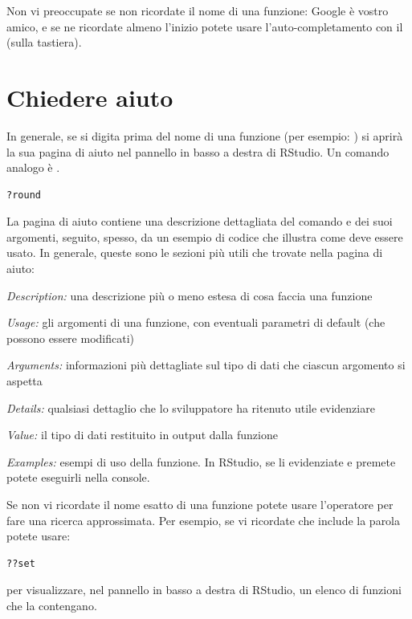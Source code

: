 \noindent Non vi preoccupate se non ricordate il nome di una funzione: Google \`e vostro amico, e se ne ricordate almeno l'inizio potete usare l'auto-completamento con il  (sulla tastiera).


\section{Chiedere aiuto}

In generale, se si digita  prima del nome di una funzione (per esempio: ) si aprir\`a la sua pagina di aiuto nel pannello in basso a destra di RStudio. Un comando analogo \`e .

\begin{lstlisting}[style=Rstyle]
?round
\end{lstlisting}

\noindent La pagina di aiuto contiene una descrizione dettagliata del comando e dei suoi argomenti, seguito, spesso, da un esempio di codice che illustra come deve essere usato. In generale, queste sono le sezioni pi\`u utili che trovate nella pagina di aiuto: 

\begin{myitemize}
\item    \emph{Description:} una descrizione pi\`u o meno estesa di cosa faccia una funzione 
\item    \emph{Usage:} gli argomenti di una funzione, con eventuali parametri di default (che possono essere modificati) 
\item    \emph{Arguments: } informazioni pi\`u dettagliate sul tipo di dati che ciascun argomento si aspetta
\item    \emph{Details: } qualsiasi dettaglio che lo sviluppatore ha ritenuto utile evidenziare
\item    \emph{Value:} il tipo di dati restituito in output dalla funzione
\item    \emph{Examples:} esempi di uso della funzione. In RStudio, se li evidenziate e premete  potete eseguirli nella console.
\end{myitemize}


\noindent Se non vi ricordate il nome esatto di una funzione potete usare l'operatore  per fare una ricerca approssimata. Per esempio, se vi ricordate che include la parola  potete usare:

\begin{lstlisting}[style=Rstyle]
??set
\end{lstlisting}
%
per visualizzare, nel pannello in basso a destra di RStudio, un elenco di funzioni che la contengano.


